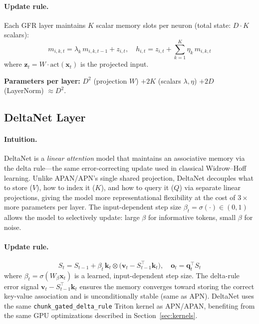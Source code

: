 \documentclass[11pt,a4paper]{article}
\begin{document}
\paragraph{Update rule.}
Each GFR layer maintains $K$ scalar memory slots per neuron (total state: $D \cdot K$ scalars):
\begin{equation}
m_{i,k,t} = \lambda_k \, m_{i,k,t-1} + z_{i,t}, \quad
h_{i,t} = z_{i,t} + \sum_{k=1}^{K} \eta_k \, m_{i,k,t}
\end{equation}
where $\mathbf{z}_t = W \cdot \text{act}(\mathbf{x}_t)$ is the projected input.

\textbf{Parameters per layer:} $D^2$ (projection $W$) $+ 2K$ (scalars $\lambda, \eta$) $+ 2D$ (LayerNorm) $\approx D^2$.

\subsection{DeltaNet Layer}

\paragraph{Intuition.}
DeltaNet is a \emph{linear attention} model that maintains an associative memory via the delta rule---the same error-correcting update used in classical Widrow--Hoff learning.
Unlike APAN/APN's single shared projection, DeltaNet decouples what to store ($V$), how to index it ($K$), and how to query it ($Q$) via separate linear projections, giving the model more representational flexibility at the cost of $3\times$ more parameters per layer.
The input-dependent step size $\beta_t = \sigma(\cdot) \in (0,1)$ allows the model to selectively update: large $\beta$ for informative tokens, small $\beta$ for noise.

\paragraph{Update rule.}
\begin{equation}
S_t = S_{t-1} + \beta_t \, \mathbf{k}_t \otimes \bigl(\mathbf{v}_t - S_{t-1}^\top \mathbf{k}_t\bigr), \quad \mathbf{o}_t = \mathbf{q}_t^\top S_t
\end{equation}
where $\beta_t = \sigma(W_\beta \mathbf{x}_t)$ is a learned, input-dependent step size.
The delta-rule error signal $\mathbf{v}_t - S_{t-1}^\top \mathbf{k}_t$ ensures the memory converges toward storing the correct key-value association and is unconditionally stable (same as APN).
DeltaNet uses the same \texttt{chunk\_gated\_delta\_rule} Triton kernel as APN/APAN, benefiting from the same GPU optimizations described in Section~\ref{sec:kernels}.
\end{document}
